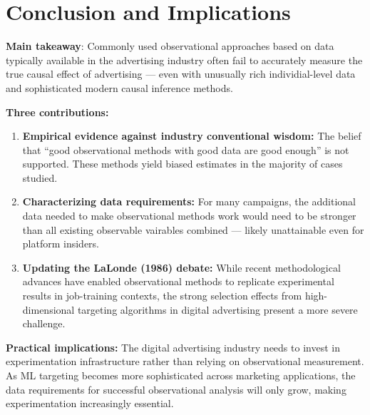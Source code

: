 \documentclass[10pt]{article}
\begin{document}
\section{Conclusion and Implications}
\textbf{Main takeaway}: Commonly used observational approaches based on data typically available in the advertising industry often fail to accurately measure the true causal effect of advertising --- even with unusually rich individial-level data and sophisticated modern causal inference methods. 

\textbf{Three contributions:}
\begin{enumerate}
    \item \textbf{Empirical evidence against industry conventional wisdom:} The belief that ``good observational methods with good data are good enough'' is not supported. These methods yield biased estimates in the majority of cases studied. 
    \item \textbf{Characterizing data requirements:} For many campaigns, the additional data needed to make observational methods work would need to be stronger than all existing observable vairables combined --- likely unattainable even for platform insiders. 
    \item \textbf{Updating the LaLonde (1986) debate:} While recent methodological advances have enabled observational methods to replicate experimental results in job-training contexts, the strong selection effects from high-dimensional targeting algorithms in digital advertising present a more severe challenge.
\end{enumerate}
\textbf{Practical implications:} The digital advertising industry needs to invest in experimentation infrastructure rather than relying on observational measurement. As ML targeting becomes more sophisticated across marketing applications, the data requirements for successful observational analysis will only grow, making experimentation increasingly essential.
\end{document}
